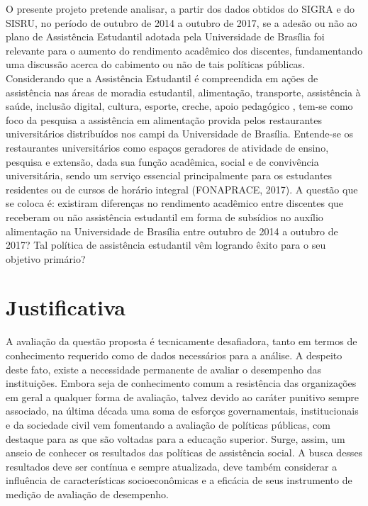 O presente projeto pretende analisar, a partir dos dados obtidos do \acrfull{SIGRA} e do \acrfull{SISRU}, no período de outubro de 2014 a outubro de 2017, se a adesão ou não ao plano de Assistência Estudantil adotada pela Universidade de Brasília foi relevante para o aumento do rendimento acadêmico dos discentes, fundamentando uma discussão acerca do cabimento ou não de tais políticas públicas.
Considerando que a Assistência Estudantil é compreendida em ações de assistência  nas áreas de moradia estudantil, alimentação, transporte, assistência à saúde, inclusão digital, cultura, esporte, creche, apoio pedagógico \cite{2007PORTARIA2007}, tem-se como foco da pesquisa a assistência em alimentação provida pelos restaurantes universitários distribuídos nos campi da Universidade de Brasília. Entende-se os restaurantes universitários como espaços geradores de atividade de ensino, pesquisa e extensão, dada sua função acadêmica, social e de convivência universitária, sendo um serviço essencial principalmente para os estudantes residentes ou de cursos de horário integral (FONAPRACE, 2017).
A questão que se coloca é: existiram diferenças no rendimento acadêmico entre discentes que receberam ou não assistência estudantil em forma de subsídios no auxílio alimentação na Universidade de Brasília entre outubro de 2014 a outubro de 2017? Tal política de assistência estudantil vêm logrando êxito para o seu objetivo primário?
\section{Justificativa}%
A avaliação da questão proposta é tecnicamente desafiadora, tanto em termos de conhecimento requerido como de dados necessários para a análise. A despeito deste fato, existe a necessidade permanente de avaliar o desempenho das instituições. Embora seja de conhecimento comum a resistência das organizações em geral a qualquer forma de avaliação, talvez devido ao caráter punitivo sempre associado, na última década uma soma de esforços governamentais, institucionais e da sociedade civil vem fomentando a avaliação de  políticas públicas, com destaque para as que são voltadas para a educação superior.
Surge, assim, um anseio de conhecer os resultados das políticas de assistência social. A busca desses resultados deve ser contínua e sempre atualizada, deve também considerar a influência de características socioeconômicas e a eficácia de seus instrumento de medição de avaliação de desempenho.
